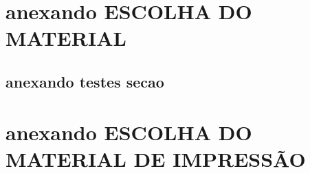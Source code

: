    \chapter{anexando ESCOLHA DO MATERIAL}
    
   \lipsum[30] %
    \section*{anexando testes secao}
    

\chapter{anexando ESCOLHA DO MATERIAL DE IMPRESSÃO}
    
   \lipsum[32] %
